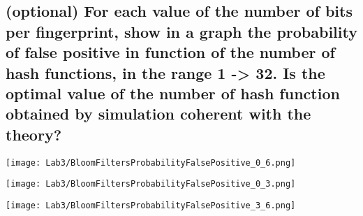 \documentclass{report}
\begin{document}


				\subsection{(optional) For each value of the number of bits per fingerprint, show in a graph the probability of false positive in function of the number of hash functions, in the range 1 -> 32. Is the optimal value of the number of hash function obtained by simulation coherent with the theory?}
				\texttt{[image: Lab3/BloomFiltersProbabilityFalsePositive\_0\_6.png]}
				\begin{minipage}{0.45\textwidth}
						\texttt{[image: Lab3/BloomFiltersProbabilityFalsePositive\_0\_3.png]}
				\end{minipage}
				\begin{minipage}{0.45\textwidth}
						\texttt{[image: Lab3/BloomFiltersProbabilityFalsePositive\_3\_6.png]}
				\end{minipage}
				
\end{document}
